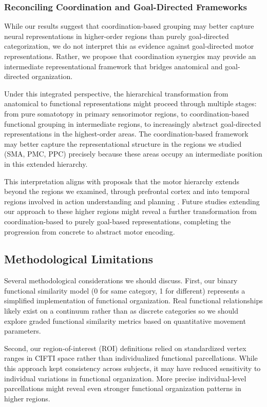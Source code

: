 \documentclass{article}
\begin{document}
\subsubsection{Reconciling Coordination and Goal-Directed Frameworks}

While our results suggest that coordination-based grouping may better capture neural representations in higher-order regions than purely goal-directed categorization, we do not interpret this as evidence against goal-directed motor representations. Rather, we propose that coordination synergies may provide an intermediate representational framework that bridges anatomical and goal-directed organization.

Under this integrated perspective, the hierarchical transformation from anatomical to functional representations might proceed through multiple stages: from pure somatotopy in primary sensorimotor regions, to coordination-based functional grouping in intermediate regions, to increasingly abstract goal-directed representations in the highest-order areas. The coordination-based framework may better capture the representational structure in the regions we studied (SMA, PMC, PPC) precisely because these areas occupy an intermediate position in this extended hierarchy.

This interpretation aligns with proposals that the motor hierarchy extends beyond the regions we examined, through prefrontal cortex and into temporal regions involved in action understanding and planning \citep{Grafton2010}. Future studies extending our approach to these higher regions might reveal a further transformation from coordination-based to purely goal-based representations, completing the progression from concrete to abstract motor encoding.

\subsection{Methodological Limitations}

Several methodological considerations we should discuss. First, our binary functional similarity model (0 for same category, 1 for different) represents a simplified implementation of functional organization. Real functional relationships likely exist on a continuum rather than as discrete categories so we should explore graded functional similarity metrics based on quantitative movement parameters.

Second, our region-of-interest (ROI) definitions relied on standardized vertex ranges in CIFTI space rather than individualized functional parcellations. While this approach kept consistency across subjects, it may have reduced sensitivity to individual variations in functional organization. More precise individual-level parcellations might reveal even stronger functional organization patterns in higher regions.
\end{document}
